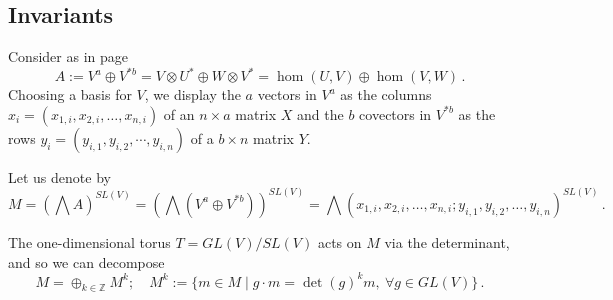 \documentclass[10pt]{amsart}
\theoremstyle{definition}
\theoremstyle{remark}
\newcommand{\Z}{\mathbb Z}
\begin{document}
\color{black}\subsection{Invariants}
 Consider as in page \pageref{lafond}\begin{equation}\label{lafond1}
A:=V^a\oplus V^{*b}=V\otimes U^*\oplus W\otimes V^*=\hom(U,V)\oplus \hom(V,W)\,.
\end{equation}   Choosing a basis for $V$, we  display the $a$ vectors in $V^a$  as the columns $x_i=(x_{1,i}, x_{2,i},\dots, x_{n,i})$ of an $n\times a$ matrix $X$  and the $b$   covectors in $V^{*b}$   as the rows $y_i=(y_{i, 1},  y_{ i,2},\cdots, y_{ i,n})$ of a  $b\times n$ matrix $Y$.\medskip
 
 
 
 
 Let us denote by  $$M=(\bigwedge A)^{SL(V)}=(\bigwedge(V^a\oplus V^{*b}))^{SL(V)}=\bigwedge  (x_{1,i}, x_{2,i},\dots,x_{n,i}; y_{i, 1},  y_{ i,2}, \dots,y_{ i,n})^{SL(V)}\,.$$\medskip
 
 The one-dimensional torus $T=GL(V)/SL(V)$ acts on $M$ via the determinant, and so we can decompose 
 $$M=\oplus_{k\in\Z}M^k;\quad M^k:=\{m\in M\mid g\cdot m=\det(g)^km,\ \forall g\in GL(V)\}\,.$$
 
\end{document}
